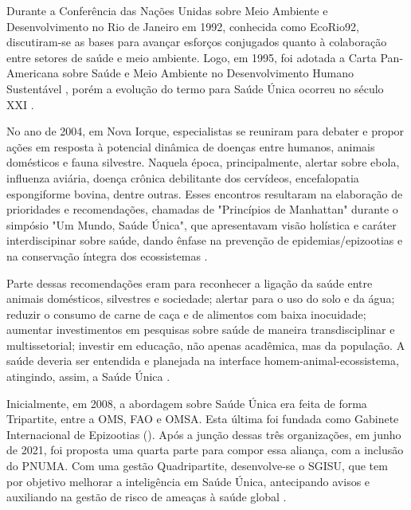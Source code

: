 \indent Durante a Conferência das Nações Unidas sobre Meio Ambiente e Desenvolvimento no Rio de Janeiro em 1992, conhecida como EcoRio92, discutiram-se as bases para avançar esforços conjugados quanto à colaboração entre setores de saúde e meio ambiente. Logo, em 1995, foi adotada a Carta Pan-Americana sobre Saúde e Meio Ambiente no Desenvolvimento Humano Sustentável \cite{S1_OPAS_OMS}, porém a evolução do termo para Saúde Única ocorreu no século XXI \cite{CFMVSaude}. 

\indent No ano de 2004, em Nova Iorque, especialistas se reuniram para debater e propor ações em resposta à potencial dinâmica de doenças entre humanos, animais domésticos e fauna silvestre. Naquela época, principalmente, alertar sobre ebola, influenza aviária, doença crônica debilitante dos cervídeos, encefalopatia espongiforme bovina, dentre outras. Esses encontros resultaram na elaboração de prioridades e recomendações, chamadas de "Princípios de Manhattan" durante o simpósio "Um Mundo, Saúde Única", que apresentavam visão holística e caráter interdiscipinar sobre saúde, dando ênfase na prevenção de epidemias/epizootias e na conservação íntegra dos ecossistemas \cite{ManhattanPrinciples2004}.

\indent Parte dessas recomendações eram para reconhecer a ligação da saúde entre animais domésticos, silvestres e sociedade; alertar para o uso do solo e da água; reduzir o consumo de carne de caça e de alimentos com baixa inocuidade; aumentar investimentos em pesquisas sobre saúde de maneira transdisciplinar e multissetorial; investir em educação, não apenas acadêmica, mas da população. A saúde deveria ser entendida e planejada na interface homem-animal-ecossistema, atingindo, assim, a Saúde Única \cite{ManhattanPrinciples2004}.

\indent Inicialmente, em 2008, a abordagem sobre Saúde Única era feita de forma Tripartite, entre a \acrfull{OMS}, \acrfull{FAO} e \acrfull{OMSA}. Esta última foi fundada como Gabinete Internacional de Epizootias (). Após a junção dessas três organizações, em junho de 2021, foi proposta uma quarta parte para compor essa aliança, com a inclusão do \acrfull{PNUMA}. Com uma gestão Quadripartite, desenvolve-se o \acrfull{SGISU}, que tem por objetivo melhorar a inteligência em Saúde Única, antecipando avisos e auxiliando na gestão de risco de ameaças à saúde global \cite{S1Quadripartite}.

